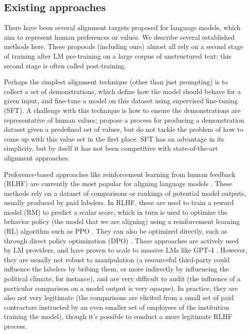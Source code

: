 \documentclass{article}
\theoremstyle{definition}
\begin{document}
\subsection{Existing approaches}
There have been several alignment targets proposed for language models, which aim to represent human preferences or values. We describe several established methods here. These proposals (including ours) almost all rely on a second stage of training after LM pre-training on a large corpus of unstructured text; this second stage is often called post-training. 

Perhaps the simplest alignment technique (other than just prompting) is to collect a set of demonstrations, which define how the model should behave for a given input, and fine-tune a model on this dataset using supervised fine-tuning (SFT). A challenge with this technique is how to ensure the demonstrations are representative of human values; \cite{solaiman2021process} propose a process for producing a demonstration dataset given a predefined set of values, but do not tackle the problem of how to come up with this value set in the first place. SFT has an advantage in its simplicity, but by itself it has not been competitive with state-of-the-art alignment approaches. 

Preference-based approaches like reinforcement learning from human feedback (RLHF) are currently the most popular for aligning language models \citep{ouyang2022training,achiam2023gpt}. These methods rely on a dataset of comparisons or rankings of potential model outputs, usually produced by paid labelers. In RLHF, these are used to train a reward model (RM) to predict a scalar score, which in turn is used to optimize the behavior policy (the model that we are aligning) using a reinforcement learning (RL) algorithm such as PPO \citep{schulman2017proximal}. They can also be optimized directly, such as through direct policy optimization (DPO) \citep{rafailov2023direct}. These approaches are actively used by LM providers, and have proven to scale to massive LMs like GPT-4 \citep{openai2023gpt4}. However, they are usually not robust to manipulation (a resourceful third-party could influence the labelers by bribing them, or more indirectly by influencing the political climate, for instance), and are very difficult to audit (the influence of a particular comparison on a model output is very opaque). In practice, they are also not very legitimate (the comparisons are elicited from a small set of paid contractors instructed by an even smaller set of employees of the institution training the model), though it's possible to conduct a more legitimate RLHF process. 
\end{document}

